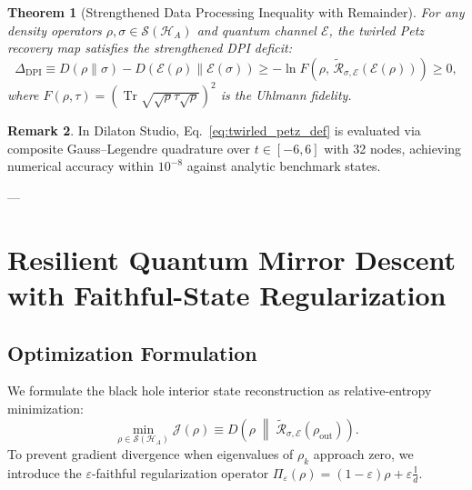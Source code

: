 \documentclass[11pt,a4paper]{article}
\theoremstyle{plain}
\newtheorem{theorem}{Theorem}[section]
\theoremstyle{definition}
\newtheorem{remark}[theorem]{Remark}
\DeclareMathOperator{\Tr}{Tr}
\begin{document}
\begin{theorem}[Strengthened Data Processing Inequality with Remainder]
For any density operators $\rho, \sigma \in \mathcal{S}(\mathcal{H}_A)$ and quantum channel $\mathcal{E}$, the twirled Petz recovery map satisfies the strengthened DPI deficit:
\begin{equation}
\Delta_{\mathrm{DPI}} \equiv D(\rho \parallel \sigma) - D(\mathcal{E}(\rho) \parallel \mathcal{E}(\sigma)) \ge -\ln F\left( \rho, \, \widetilde{\mathcal{R}}_{\sigma, \mathcal{E}}(\mathcal{E}(\rho)) \right) \ge 0,
\end{equation}
where $F(\rho, \tau) = (\Tr\sqrt{\sqrt{\rho}\tau\sqrt{\rho}})^2$ is the Uhlmann fidelity.
\end{theorem}
\begin{remark}
In Dilaton Studio, Eq.~\eqref{eq:twirled_petz_def} is evaluated via composite Gauss--Legendre quadrature over $t \in [-6, 6]$ with 32 nodes, achieving numerical accuracy within $10^{-8}$ against analytic benchmark states.
\end{remark}

---

\section{Resilient Quantum Mirror Descent with Faithful-State Regularization}

\subsection{Optimization Formulation}
We formulate the black hole interior state reconstruction as relative-entropy minimization:
\begin{equation}
\min_{\rho \in \mathcal{S}(\mathcal{H}_A)} \mathcal{J}(\rho) \equiv D\left( \rho \; \middle\| \; \widetilde{\mathcal{R}}_{\sigma, \mathcal{E}}(\rho_{\mathrm{out}}) \right).
\end{equation}
To prevent gradient divergence when eigenvalues of $\rho_k$ approach zero, we introduce the $\varepsilon$-faithful regularization operator $\Pi_\varepsilon(\rho) = (1 - \varepsilon)\rho + \varepsilon \frac{\mathbb{I}}{d}$.
\end{document}
